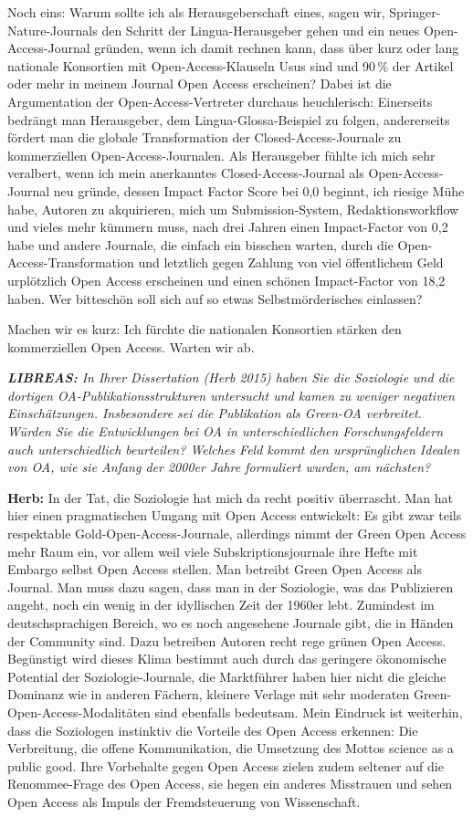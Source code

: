 \documentclass[a4paper,
fontsize=11pt,
oneside,
numbers=noperiodatend,
parskip=half-,
bibliography=totoc,
final
]{scrartcl}
\begin{document}
Noch eins: Warum sollte ich als Herausgeberschaft eines, sagen wir,
Springer-Nature-Journals den Schritt der Lingua-Herausgeber gehen und
ein neues Open-Access-Journal gründen, wenn ich damit rechnen kann, dass
über kurz oder lang nationale Konsortien mit Open-Access-Klauseln Usus
sind und 90\,\% der Artikel oder mehr in meinem Journal Open Access
erscheinen? Dabei ist die Argumentation der Open-Access-Vertreter
durchaus heuchlerisch: Einerseits bedrängt man Herausgeber, dem
Lingua-Glossa-Beispiel zu folgen, andererseits fördert man die globale
Transformation der Closed-Access-Journale zu kommerziellen
Open-Access-Journalen. Als Herausgeber fühlte ich mich sehr veralbert,
wenn ich mein anerkanntes Closed-Access-Journal als Open-Access-Journal
neu gründe, dessen Impact Factor Score bei 0,0 beginnt, ich riesige Mühe
habe, Autoren zu akquirieren, mich um Submission-System,
Redaktionsworkflow und vieles mehr kümmern muss, nach drei Jahren einen
Impact-Factor von 0,2 habe und andere Journale, die einfach ein bisschen
warten, durch die Open-Access-Transformation und letztlich gegen Zahlung
von viel öffentlichem Geld urplötzlich Open Access erscheinen und einen
schönen Impact-Factor von 18,2 haben. Wer bitteschön soll sich auf so
etwas Selbstmörderisches einlassen?

Machen wir es kurz: Ich fürchte die nationalen Konsortien stärken den
kommerziellen Open Access. Warten wir ab.

\emph{\textbf{LIBREAS:} In Ihrer Dissertation (Herb 2015) haben Sie die
Soziologie und die dortigen OA-Publikationsstrukturen untersucht und
kamen zu weniger negativen Einschätzungen. Insbesondere sei die
Publikation als Green-OA verbreitet. Würden Sie die Entwicklungen bei OA
in unterschiedlichen Forschungsfeldern auch unterschiedlich beurteilen?
Welches Feld kommt den ursprünglichen Idealen von OA, wie sie Anfang der
2000er Jahre formuliert wurden, am nächsten?}

\textbf{Herb:} In der Tat, die Soziologie hat mich da recht positiv
überrascht. Man hat hier einen pragmatischen Umgang mit Open Access
entwickelt: Es gibt zwar teils respektable Gold-Open-Access-Journale,
allerdings nimmt der Green Open Access mehr Raum ein, vor allem weil
viele Subskriptionsjournale ihre Hefte mit Embargo selbst Open Access
stellen. Man betreibt Green Open Access als Journal. Man muss dazu
sagen, dass man in der Soziologie, was das Publizieren angeht, noch ein
wenig in der idyllischen Zeit der 1960er lebt. Zumindest im
deutschsprachigen Bereich, wo es noch angesehene Journale gibt, die in
Händen der Community sind. Dazu betreiben Autoren recht rege grünen Open
Access. Begünstigt wird dieses Klima bestimmt auch durch das geringere
ökonomische Potential der Soziologie-Journale, die Marktführer haben
hier nicht die gleiche Dominanz wie in anderen Fächern, kleinere Verlage
mit sehr moderaten Green-Open-Access-Modalitäten sind ebenfalls
bedeutsam. Mein Eindruck ist weiterhin, dass die Soziologen instinktiv
die Vorteile des Open Access erkennen: Die Verbreitung, die offene
Kommunikation, die Umsetzung des Mottos science as a public good. Ihre
Vorbehalte gegen Open Access zielen zudem seltener auf die
Renommee-Frage des Open Access, sie hegen ein anderes Misstrauen und
sehen Open Access als Impuls der Fremdsteuerung von Wissenschaft.
\end{document}
